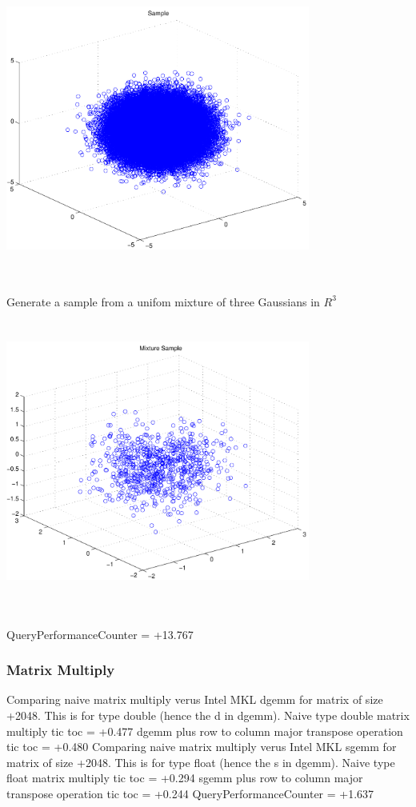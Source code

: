 \documentclass[9pt]{article}
\theoremstyle{plain}
\theoremstyle{definition}
\theoremstyle{remark}
\numberwithin{equation}{section}
\begin{document}
\includegraphics[width=10.0cm,height=10.0cm]{R_3_Normal.pdf}

Generate a sample from a unifom mixture of three Gaussians in $R^3$
\includegraphics[width=10.0cm,height=10.0cm]{R_3_Normal_Mixture.pdf}

QueryPerformanceCounter  =  +13.767
\subsubsection{Matrix Multiply}
Comparing naive matrix multiply verus Intel MKL dgemm for matrix of size +2048.
This is for type double (hence the d in dgemm).
Naive type double matrix multiply tic toc  =  +0.477
dgemm plus row to column major transpose operation tic toc  =  +0.480
Comparing naive matrix multiply verus Intel MKL sgemm for matrix of size +2048.
This is for type float (hence the s in dgemm).
Naive type float matrix multiply tic toc  =  +0.294
sgemm plus row to column major transpose operation tic toc  =  +0.244
QueryPerformanceCounter  =  +1.637
\end{document}
